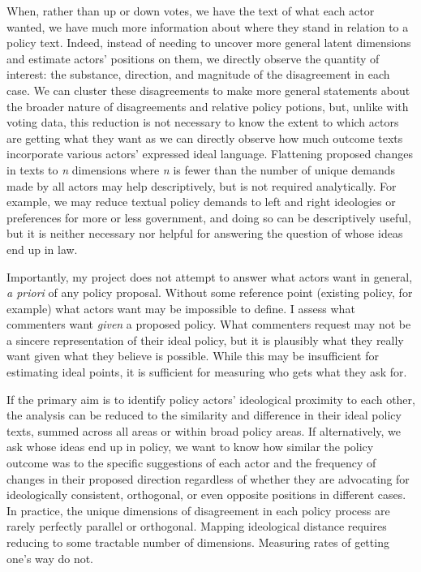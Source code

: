 When, rather than up or down votes, we have the text of what each actor wanted, we have much more information about where they stand in relation to a policy text. Indeed, instead of needing to uncover more general latent dimensions and estimate actors' positions on them, we directly observe the quantity of interest: the substance, direction, and magnitude of the disagreement in each case. We can cluster these disagreements to make more general statements about the broader nature of disagreements and relative policy potions, but, unlike with voting data, this reduction is not necessary to know the extent to which actors are getting what they want as we can directly observe how much outcome texts incorporate various actors' expressed ideal language. Flattening proposed changes in texts to \textit{n} dimensions where \textit{n} is fewer than the number of unique demands made by all actors may help descriptively, but is not required analytically. For example, we may reduce textual policy demands to left and right ideologies or preferences for more or less government, and doing so can be descriptively useful, but it is neither necessary nor helpful for answering the question of whose ideas end up in law.

Importantly, my project does not attempt to answer what actors want in general, \textit{a priori} of any policy proposal. Without some reference point (existing policy, for example) what actors want may be impossible to define. I assess what commenters want \textit{given} a proposed policy. What commenters request may not be a sincere representation of their ideal policy, but it is plausibly what they really want given what they believe is possible. While this may be insufficient for estimating ideal points, it is sufficient for measuring who gets what they ask for. 

If the primary aim is to identify policy actors' ideological proximity to each other, the analysis can be reduced to the similarity and difference in their ideal policy texts, summed across all areas or within broad policy areas. If alternatively, we ask whose ideas end up in policy, we want to know how similar the policy outcome was to the specific suggestions of each actor and the frequency of changes in their proposed direction regardless of whether they are advocating for ideologically consistent, orthogonal, or even opposite positions in different cases. In practice, the unique dimensions of disagreement in each policy process are rarely perfectly parallel or orthogonal. Mapping ideological distance requires reducing to some tractable number of dimensions. Measuring rates of getting one's way do not.

